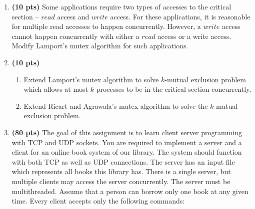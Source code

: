 \documentclass[letter, 11pt] {article}
\begin{document}
\begin{enumerate}



\item \textbf{(10 pts)} Some applications require two types of accesses to the
  critical section -- $read$ access and $write$ access. For these applications,
  it is reasonable for multiple read accesses to happen concurrently. However,
  a $write$ access cannot happen concurrently with either a $read$ access or a
  write access. Modify Lamport's mutex algorithm for such applications.

\item \textbf{(10 pts)}
  \begin{enumerate}
    \item Extend Lamport's mutex algorithm to solve $k$-mutual exclusion
      problem which allows at most $k$ processes to be in the critical section
      concurrently.
    \item Extend Ricart and Agrawala's mutex algorithm to solve the $k$-mutual
      exclusion problem.
  \end{enumerate}

\item \textbf{(80 pts)} The goal of this assignment is to learn client server
  programming with TCP and UDP sockets. You are required to implement a server
  and a client for an online book system of our library. 
  The system should function with both
  TCP as well as UDP connections. The server has an input file which represents
  all books this library has. There is a single server, but multiple clients may
  access the server concurrently. The server must be multithreaded.
   Assume that a person can borrow only one 
  book at any given time.  Every client accepts only the following
  commands:


\end{enumerate}
\end{document}
